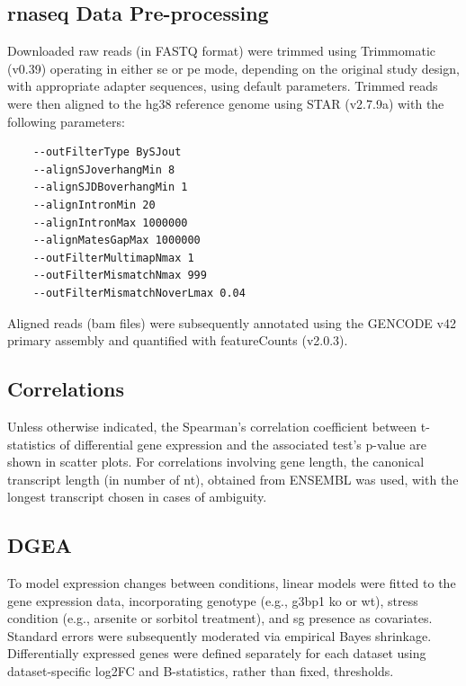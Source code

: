 \subsection{\gls{rnaseq} Data Pre-processing}

Downloaded raw reads (in FASTQ format) were trimmed using Trimmomatic (v0.39)\cite{bolger_trimmomatic_2014} operating in either \gls{se} or \gls{pe} mode, depending on the original study design, with appropriate adapter sequences, using default parameters. Trimmed reads were then aligned to the \gls{hg38} reference genome using STAR (v2.7.9a)\cite{dobin_star_2013} with the following parameters:

\begin{lstlisting}
	--outFilterType BySJout
	--alignSJoverhangMin 8
	--alignSJDBoverhangMin 1
	--alignIntronMin 20
	--alignIntronMax 1000000
	--alignMatesGapMax 1000000
	--outFilterMultimapNmax 1
	--outFilterMismatchNmax 999
	--outFilterMismatchNoverLmax 0.04
\end{lstlisting}
\noindent
Aligned reads (\gls{bam} files) were subsequently annotated using the GENCODE v42 primary assembly\cite{frankish_gencode_2021} and quantified with featureCounts (v2.0.3)\cite{liao_featurecounts_2014}.

\subsection{Correlations}

Unless otherwise indicated, the Spearman's correlation coefficient between t-statistics of differential gene expression and the associated test's p-value are shown in scatter plots. For correlations involving gene length, the canonical transcript length (in number of \gls{nt}), obtained from ENSEMBL\cite{cunningham_ensembl_2022} was used, with the longest transcript chosen in cases of ambiguity\cite{cunningham_ensembl_2022}. 

\subsection{DGEA}

To model expression changes between conditions, linear models were fitted to the gene expression data, incorporating genotype (e.g., \gls{g3bp1} \gls{ko} or \gls{wt}), stress condition (e.g., arsenite or sorbitol treatment), and \gls{sg} presence as covariates. Standard errors were subsequently moderated via empirical Bayes shrinkage\cite{smyth_linear_nodate}. Differentially expressed genes were defined separately for each dataset using dataset-specific log2FC and B-statistics, rather than fixed, thresholds.

